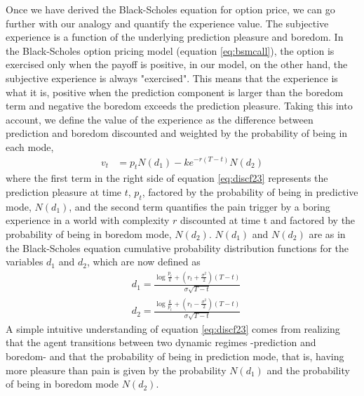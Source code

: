 \documentclass[11pt, onecolumn]{article}
\begin{document}
Once we have derived the Black-Scholes equation for option price, we can go further with our analogy and quantify the experience value. The subjective experience is a function of the underlying prediction pleasure and boredom. In the Black-Scholes option pricing model (equation \ref{eq:bsmcall}), the option is exercised only when the payoff is positive, in our model, on the other hand, the subjective experience is always "exercised". This means that the experience is what it is, positive when the prediction component is larger than the boredom term and negative the boredom exceeds the prediction pleasure. Taking this into account, we define the value of the experience as the difference between prediction and boredom discounted and weighted by the probability of being in each mode,
\begin{equation}
\begin{split}
    v_t  & =  p_{t}N(d_1) - k e^{-r(T-t)}N(d_2)
\end{split}
\label{eq:discf23}
\end{equation}
where the first term in the right side of equation \ref{eq:discf23} represents the prediction pleasure at time $t$, $p_{t}$, factored by the probability of being in predictive mode, $N(d_1)$, and the second term quantifies the pain trigger by a boring experience in a world with complexity $r$ discounted at time t and factored by the probability of being in boredom mode, $N(d_2)$. $N(d_1)$ and $N(d_2)$ are as in the Black-Scholes equation cumulative probability distribution functions for the variables $d_1$ and $d_2$, which are now defined as 
\begin{equation}
\begin{split}
    & d_1 = \frac{\log \frac{p_t}{k}  + (r_t + \frac{\sigma ^2}{2})(T-t)}{\sigma \sqrt{T-t}}  \\
    & d_2 = \frac{\log \frac{k}{p_t}  + (r_t - \frac{\sigma ^2}{2})(T-t)}{\sigma \sqrt{T-t}} 
\end{split}
\label{eq:discd1d2}
\end{equation}
A simple intuitive understanding of equation \ref{eq:discf23} comes from realizing that the agent transitions between two dynamic regimes -prediction and boredom- and that the probability of being in prediction mode, that is, having more pleasure than pain is given by the probability $N(d_1)$ and the probability of being in boredom mode $N(d_2)$.
\end{document}
